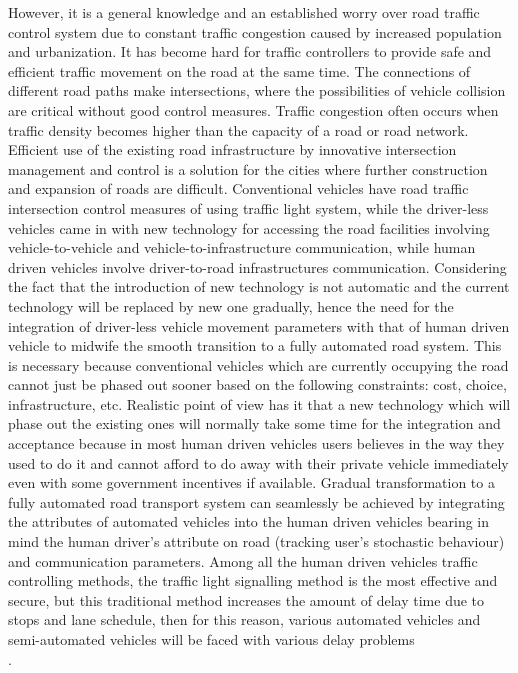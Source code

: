 \documentclass{book}
\begin{document}
However, it is a general knowledge and an established worry over road traffic control system due to constant traffic congestion caused by increased population and urbanization.  It has become hard for traffic  controllers to provide safe and efficient traffic movement on the road at the same time. The connections of different road paths make intersections, where the possibilities of vehicle collision are critical without good control measures. Traffic congestion often occurs when traffic density becomes higher than the capacity of a road or road network. Efficient use of the existing road infrastructure by innovative intersection management and control is a solution for the cities where further construction and expansion of roads are difficult. Conventional vehicles have   road traffic intersection control measures of using traffic light system, while the driver-less vehicles came in with new technology for accessing the road facilities involving vehicle-to-vehicle and vehicle-to-infrastructure communication, while human driven vehicles involve driver-to-road infrastructures communication. Considering the fact that the introduction of new technology is not automatic and the current technology will be replaced by new one gradually, hence the need for the integration of driver-less vehicle movement parameters with that of human driven vehicle to midwife the smooth transition to a fully automated road system. This is necessary because conventional vehicles which are currently occupying the road cannot just be phased out sooner based on the following constraints: cost, choice, infrastructure, etc. Realistic point of view has it that a new technology which will phase out the existing ones will normally take some time for the integration and acceptance because in most human driven vehicles users believes in the way they used to do it and cannot afford to do away with their private vehicle immediately even with some government incentives if available. Gradual transformation to a fully automated road transport system can seamlessly be achieved by integrating the attributes of automated vehicles into the human driven vehicles bearing in mind the human driver’s attribute on road (tracking user's stochastic behaviour) and communication parameters. Among all the human driven vehicles traffic controlling methods, the traffic light signalling method is the most effective and secure, but this traditional method increases the amount of delay time due to stops and lane schedule, then for this reason, various automated vehicles and semi-automated vehicles will be faced with various delay problems \cite{wen2019solving}\\ .
\end{document}
